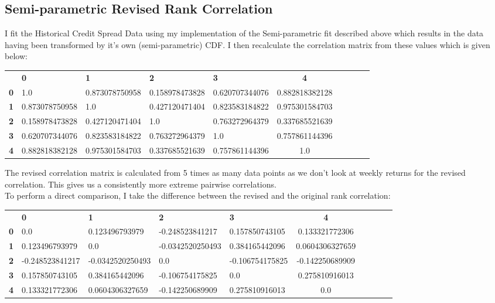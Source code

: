 \documentclass{report}
\theoremstyle{plain}
\theoremstyle{definition}
\begin{document}
\subsection{Semi-parametric Revised Rank Correlation}

I fit the Historical Credit Spread Data using my implementation of the Semi-parametric fit described above which results in the data having been transformed by it's own (semi-parametric) CDF. I then recalculate the correlation matrix from these values which is given below:

\begin{center}
	\begin{tabular}{|l|l|l|l|l|c|c|c|c|c|}
		\hline
		& \textbf{0} & \textbf{1} & \textbf{2} & \textbf{3} & \textbf{4}\\\hhline{|=|=|=|=|=|=|}
		\textbf{0} & 1.0 & 0.873078750958 & 0.158978473828 & 0.620707344076 & 0.882818382128\\
		\textbf{1} & 0.873078750958 & 1.0 & 0.427120471404 & 0.823583184822 & 0.975301584703\\
		\textbf{2} & 0.158978473828 & 0.427120471404 & 1.0 & 0.763272964379 & 0.337685521639\\
		\textbf{3} & 0.620707344076 & 0.823583184822 & 0.763272964379 & 1.0 & 0.757861144396\\
		\textbf{4} & 0.882818382128 & 0.975301584703 & 0.337685521639 & 0.757861144396 & 1.0\\
		\hline
	\end{tabular}
\end{center}

The revised correlation matrix is calculated from 5 times as many data points as we don't look at weekly returns for the revised correlation. This gives us a consistently more extreme pairwise correlations.\\

To perform a direct comparison, I take the difference between the revised and the original rank correlation:

\begin{center}
	\begin{tabular}{|l|l|l|l|l|c|c|c|c|c|}
		\hline
		& \textbf{0} & \textbf{1} & \textbf{2} & \textbf{3} & \textbf{4}\\\hhline{|=|=|=|=|=|=|}
		\textbf{0} & 0.0 & 0.123496793979 & -0.248523841217 & 0.157850743105 & 0.133321772306\\
		\textbf{1} & 0.123496793979 & 0.0 & -0.0342520250493 & 0.384165442096 & 0.0604306327659\\
		\textbf{2} & -0.248523841217 & -0.0342520250493 & 0.0 & -0.106754175825 & -0.142250689909\\
		\textbf{3} & 0.157850743105 & 0.384165442096 & -0.106754175825 & 0.0 & 0.275810916013\\
		\textbf{4} & 0.133321772306 & 0.0604306327659 & -0.142250689909 & 0.275810916013 & 0.0\\
		\hline
	\end{tabular}
\end{center}
\end{document}
